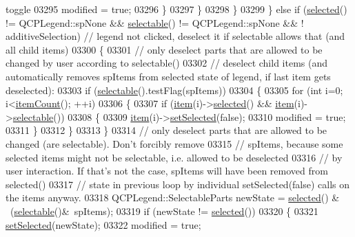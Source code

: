 \begin{DoxyCode}
{       toggle}
03295           modified = \textcolor{keyword}{true};
03296         \}
03297       \}
03298     \}
03299   \} \textcolor{keywordflow}{else} \textcolor{keywordflow}{if} (\hyperlink{a00045_a10948e896935ad14f374e6f712afaae9}{selected}() != QCPLegend::spNone && \hyperlink{a00045_a459f39581d1eba9ee80557837601e21c}{selectable}() != QCPLegend::spNone && !
      additiveSelection) \textcolor{comment}{// legend not clicked, deselect it if selectable allows that (and all child items)}
03300   \{
03301     \textcolor{comment}{// only deselect parts that are allowed to be changed by user according to selectable()}
03302     \textcolor{comment}{// deselect child items (and automatically removes spItems from selected state of legend, if last item
       gets deselected):}
03303     \textcolor{keywordflow}{if} (\hyperlink{a00045_a459f39581d1eba9ee80557837601e21c}{selectable}().testFlag(spItems)) 
03304     \{
03305       \textcolor{keywordflow}{for} (\textcolor{keywordtype}{int} i=0; i<\hyperlink{a00045_a198228e9cdc78d3a3c306fa6763d0404}{itemCount}(); ++i)
03306       \{
03307         \textcolor{keywordflow}{if} (\hyperlink{a00045_a454272d7094437beb3278a2294006da5}{item}(i)->\hyperlink{a00023_ac776e68e3367704452131c6aa9908bb9}{selected}() && \hyperlink{a00045_a454272d7094437beb3278a2294006da5}{item}(i)->\hyperlink{a00023_a0a0205f33f37edae50826c24cb8f1983}{selectable}())
03308         \{
03309           \hyperlink{a00045_a454272d7094437beb3278a2294006da5}{item}(i)->\hyperlink{a00023_a6eed93b0ab99cb3eabb043fb08179c2b}{setSelected}(\textcolor{keyword}{false});
03310           modified = \textcolor{keyword}{true};
03311         \}
03312       \}
03313     \}
03314     \textcolor{comment}{// only deselect parts that are allowed to be changed (are selectable). Don't forcibly remove}
03315     \textcolor{comment}{// spItems, because some selected items might not be selectable, i.e. allowed to be deselected}
03316     \textcolor{comment}{// by user interaction. If that's not the case, spItems will have been removed from selected()}
03317     \textcolor{comment}{// state in previous loop by individual setSelected(false) calls on the items anyway.}
03318     QCPLegend::SelectableParts newState = \hyperlink{a00045_a10948e896935ad14f374e6f712afaae9}{selected}() & ~(\hyperlink{a00045_a459f39581d1eba9ee80557837601e21c}{selectable}()&~spItems);
03319     \textcolor{keywordflow}{if} (newState != \hyperlink{a00045_a10948e896935ad14f374e6f712afaae9}{selected}())
03320     \{
03321       \hyperlink{a00045_a752c48b30f8ba870b55e79659385f107}{setSelected}(newState);
03322       modified = \textcolor{keyword}{true};

\end{DoxyCode}
